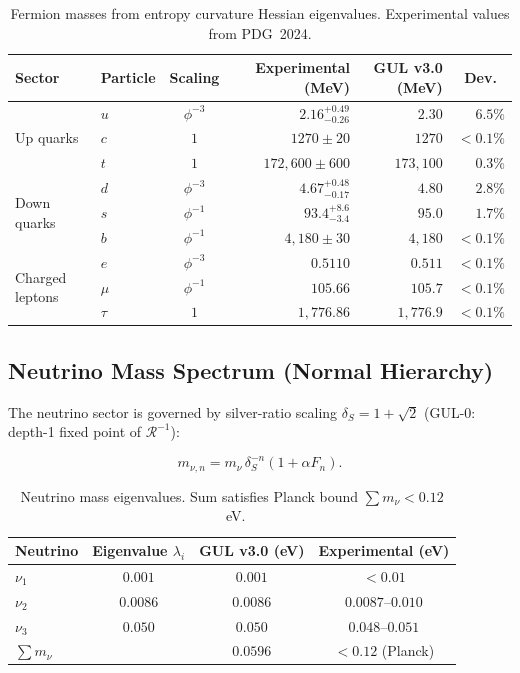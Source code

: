 \documentclass[11pt]{article}
\begin{document}
\begin{table}[htbp]
\centering
\caption{Fermion masses from entropy curvature Hessian eigenvalues.
Experimental values from PDG~2024.}
\label{tab:fermion_masses}
\begin{tabular}{@{}llcrrr@{}}
\toprule
Sector & Particle & Scaling & Experimental (MeV) & GUL v3.0 (MeV) & Dev.\ \\
\midrule
\multirow{3}{*}{Up quarks}
  & $u$ & $\phi^{-3}$ & $2.16^{+0.49}_{-0.26}$ & $2.30$  & $6.5\%$ \\
  & $c$ & $1$         & $1270 \pm 20$            & $1270$  & ${<}0.1\%$ \\
  & $t$ & $1$         & $172{,}600 \pm 600$      & $173{,}100$ & $0.3\%$ \\
\midrule
\multirow{3}{*}{Down quarks}
  & $d$ & $\phi^{-3}$ & $4.67^{+0.48}_{-0.17}$ & $4.80$  & $2.8\%$ \\
  & $s$ & $\phi^{-1}$ & $93.4^{+8.6}_{-3.4}$   & $95.0$  & $1.7\%$ \\
  & $b$ & $\phi^{-1}$ & $4{,}180 \pm 30$         & $4{,}180$ & ${<}0.1\%$ \\
\midrule
\multirow{3}{*}{Charged leptons}
  & $e$    & $\phi^{-3}$ & $0.5110$    & $0.511$ & ${<}0.1\%$ \\
  & $\mu$  & $\phi^{-1}$ & $105.66$    & $105.7$ & ${<}0.1\%$ \\
  & $\tau$ & $1$         & $1{,}776.86$ & $1{,}776.9$ & ${<}0.1\%$ \\
\bottomrule
\end{tabular}
\end{table}

\subsection{Neutrino Mass Spectrum (Normal Hierarchy)}

The neutrino sector is governed by silver-ratio scaling
$\delta_S=1+\sqrt{2}$ (GUL-0: depth-1 fixed point of
$\mathcal{R}^{-1}$):

\begin{equation}
  m_{\nu,n} = m_\nu\,\delta_S^{-n}(1+\alpha F_n).
\end{equation}

\begin{table}[htbp]
\centering
\caption{Neutrino mass eigenvalues. Sum satisfies Planck bound
$\sum m_\nu < 0.12$~eV.}
\label{tab:neutrino_masses}
\begin{tabular}{@{}lccc@{}}
\toprule
Neutrino & Eigenvalue $\lambda_i$ & GUL v3.0 (eV) & Experimental (eV) \\
\midrule
$\nu_1$ & $0.001$ & $0.001$ & $<0.01$ \\
$\nu_2$ & $0.0086$ & $0.0086$ & $0.0087$--$0.010$ \\
$\nu_3$ & $0.050$  & $0.050$  & $0.048$--$0.051$ \\
\midrule
$\sum m_\nu$ & & $0.0596$ & $<0.12$ (Planck) \\
\bottomrule
\end{tabular}
\end{table}
\end{document}
